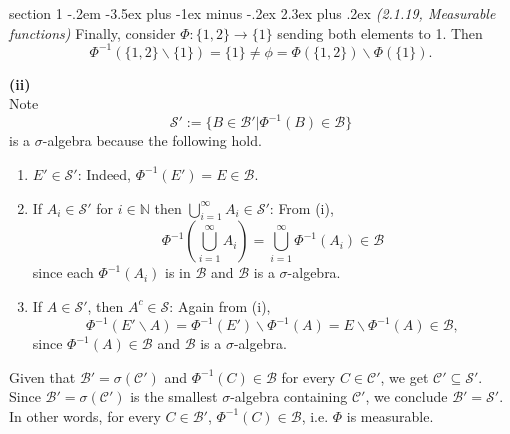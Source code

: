 \documentclass[12pt]{article}
\makeatletter
\theoremstyle{norm}
\newtheorem{lem}[thm]{Lemma}
\newcommand{\N}[0]{\mathbb{N}}
\providecommand{\cal}[1]{\mathcal{#1}}
\renewcommand{\cal}[1]{\mathcal{#1}}
\newcommand{\subeq}[0]{\subseteq}
\newcommand{\si}[0]{\sigma}
\newcommand{\pa}[1]{\left( {#1} \right)}
\newcommand{\subprob}[1]{\noindent\textbf{#1}\\}
\newcommand{\bs}[0]{\backslash}
\newcommand{\sia}[0]{ $\si$-algebra}
\newenvironment{problem}{\@startsection
       {section}
       {1}
       {-.2em}
       {-3.5ex plus -1ex minus -.2ex}
       {2.3ex plus .2ex}
       {\pagebreak[3]%
       \large\bf\noindent{Problem }
       }
       }
       {%
       }
\makeatother
\begin{document}
\begin{problem}{\it (2.1.19, Measurable functions)}
Finally, consider $\Phi:\{1,2\}\to \{1\}$ sending both elements to 1. Then
\[
\Phi^{-1}(\{1,2\}\bs\{1\})=\{1\}\neq \phi=\Phi(\{1,2\})\bs\Phi(\{1\}).
\]

\subprob{(ii)}
Note
\[
\cal S':=\{B\in \cal B'|\Phi^{-1}(B)\in \cal B\}
\]
is a $\sigma$-algebra because the following hold.
\begin{enumerate}
\item $E'\in \cal S'$: Indeed, $\Phi^{-1}(E')=E\in \cal B$.
\item If $A_i\in \cal S'$ for $i\in \N$ then $\bigcup_{i=1}^{\infty}A_i\in \cal S'$: From (i),
\[
\Phi^{-1}\pa{\bigcup_{i=1}^{\infty}A_i}=\bigcup_{i=1}^{\infty} \Phi^{-1}(A_i)\in \cal B
\]
since each $\Phi^{-1}(A_i)$ is in $\cal B$ and $\cal B$ is a \sia.
\item If $A\in \cal S'$, then $A^c\in \cal S$: Again from (i),
\[
\Phi^{-1}(E'\bs A)=\Phi^{-1}(E')\bs \Phi^{-1}(A)=E\bs \Phi^{-1}(A)\in \cal B,
\]
since $\Phi^{-1}(A)\in \cal B$ and $\cal B$ is a \sia.
\end{enumerate}
Given that $\cal B'=\sigma(\cal C')$ and $\Phi^{-1}(C)\in \cal B$ for every $C\in \cal C'$, we get $\cal C'\subeq \cal S'$. Since $\cal B'=\sigma(\cal C')$ is the smallest \sia{} containing $\cal C'$, we conclude $\cal B'= \cal S'$. In other words, for every $C\in \cal B'$, $\Phi^{-1}(C)\in \cal B$, i.e. $\Phi$ is measurable.\\


\end{problem}
\end{document}
